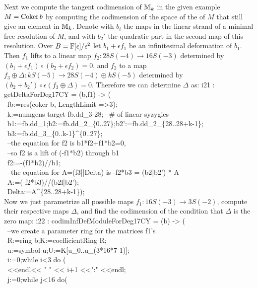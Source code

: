 Next we compute the tangent codimension of ${\mathbb M}_k$ in the given example 
$M=\operatorname{Coker} b$ by computing the codimension of the space 
of the  of $M$
that still give an element in ${\mathbb M}_k$.
Denote with $b_i$ the maps in the linear strand of a minimal free resolution of $M$, 
and with $b_2'$ the quadratic part in the second map of this resolution.
Over $B={\mathbb F}[\epsilon]/{\epsilon^2}$ 
let $b_1+\epsilon f_1$ be an infinitesimal deformation of $b_1$. 
Then $f_1$ lifts to a linear map $f_2\colon 28S(-4) \to 16S(-3)$ determined by 
$(b_1+\epsilon f_1)\circ(b_2+\epsilon f_2)=0$, and $f_2$ to a map 
$f_3\oplus\Delta\colon k S(-5) \to 28 S(-4)\oplus k S(-5)$ determined by
$(b_2+b_2')\circ\epsilon (f_3\oplus\Delta)=0$.
Therefore we can determine $\Delta$ as:
\beginOutput
i21 : getDeltaForDeg17CY = (b,f1) -> (\\
\           fb:=res(coker b, LengthLimit =>3);\\
\           k:=numgens target fb.dd_3-28; --# of linear syzygies\\
\           b1:=fb.dd_1;b2:=fb.dd_2_\{0..27\};b2':=fb.dd_2_\{28..28+k-1\};\\
\           b3:=fb.dd_3_\{0..k-1\}^\{0..27\};\\
\           --the equation for f2 is b1*f2+f1*b2=0, \\
\           --so f2 is a lift of (-f1*b2) through b1 \\
\           f2:=-(f1*b2)//b1;\\
\           --the equation for A=(f3||Delta) is -f2*b3 = (b2|b2') * A\\
\           A:=(-f2*b3)//(b2l|b2');\\
\           Delta:=A^\{28..28+k-1\});\\
\endOutput
Now we just parametrize all possible maps $f_1\colon 16S(-3) \to 3S(-2)$,
compute their respective maps $\Delta$,
and find the codimension of the condition that $\Delta$ is the zero map:
\beginOutput
i22 : codimInfDefModuleForDeg17CY = (b) -> (\\
\           --we create a parameter ring for the matrices f1's\\
\           R:=ring b;K:=coefficientRing R;\\
\           u:=symbol u;U:=K[u_0..u_(3*16*7-1)];\\
\           i:=0;while i<3 do (\\
\                <<endl<< " " << i+1 <<":" <<endl;\\
\                j:=0;while j<16 do(\\
